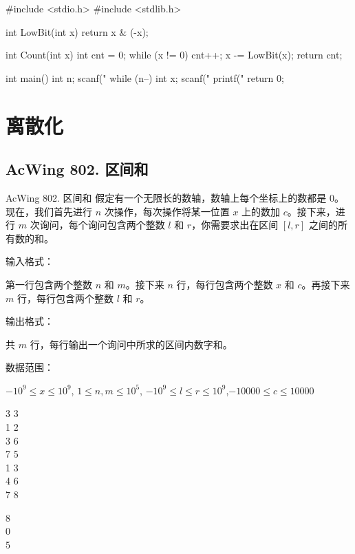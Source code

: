 \begin{mycpptwocol}[LowBit 运算]
    #include <stdio.h>
    #include <stdlib.h>

    int LowBit(int x)
        {
        return x & (-x);
    }

    int Count(int x)
        {
        int cnt = 0;
        while (x != 0) {
            cnt++;
            x -= LowBit(x);
        }
        return cnt;
    }

    int main()
        {
        int n;
        scanf("%
        while (n--) {
            int x;
            scanf("%
            printf("%
        }
        return 0;
    }
\end{mycpptwocol}


\section{离散化}

\subsection{AcWing 802. 区间和}
\begin{titledbox}{AcWing 802. 区间和}
    假定有一个无限长的数轴，数轴上每个坐标上的数都是 $0$。现在，我们首先进行 $n$ 次操作，每次操作将某一位置 $x$ 上的数加 $c$。接下来，进行 $m$ 次询问，每个询问包含两个整数 $l$ 和 $r$，你需要求出在区间 $[l, r]$ 之间的所有数的和。

    输入格式：

    第一行包含两个整数 $n$ 和 $m$。接下来 $n$ 行，每行包含两个整数 $x$ 和 $c$。再接下来 $m$ 行，每行包含两个整数 $l$ 和 $r$。

    输出格式：

    共 $m$ 行，每行输出一个询问中所求的区间内数字和。

    数据范围：

    $-10^9 \le x \le 10^9$, $1 \le n,m \le 10^5$, $-10^9 \le l \le r \le 10^9$,$-10000 \le c \le 10000$

    \begin{inputblock}
        3 3 \\
        1 2 \\
        3 6 \\
        7 5 \\
        1 3 \\
        4 6 \\
        7 8
    \end{inputblock}
    \begin{outputblock}
        8 \\
        0 \\
        5
    \end{outputblock}
\end{titledbox}


